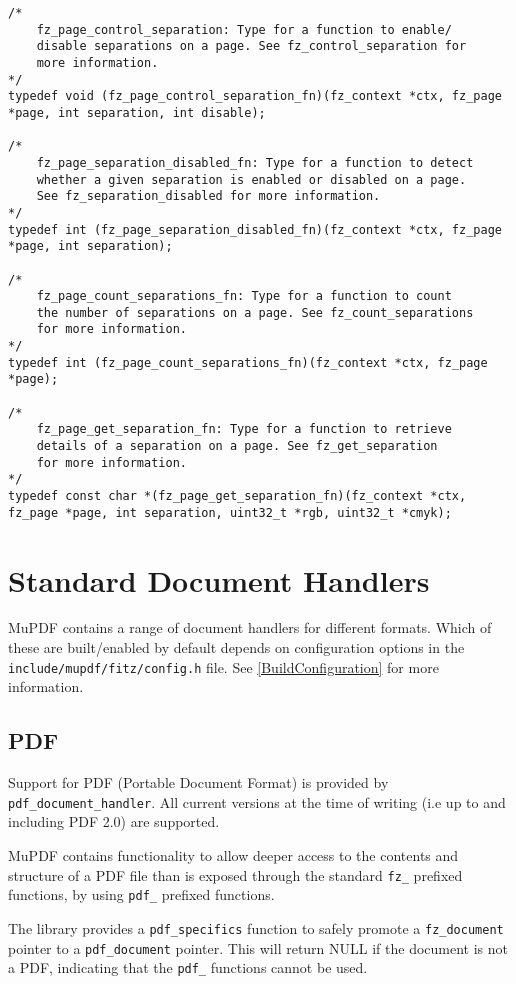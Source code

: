 \documentclass[oneside]{book}
\newcommand{\rjwref}[1] {\autoref{#1} \nameref{#1}}
\begin{document}
\begin{lstlisting}
/*
	fz_page_control_separation: Type for a function to enable/
	disable separations on a page. See fz_control_separation for
	more information.
*/
typedef void (fz_page_control_separation_fn)(fz_context *ctx, fz_page *page, int separation, int disable);

/*
	fz_page_separation_disabled_fn: Type for a function to detect
	whether a given separation is enabled or disabled on a page.
	See fz_separation_disabled for more information.
*/
typedef int (fz_page_separation_disabled_fn)(fz_context *ctx, fz_page *page, int separation);

/*
	fz_page_count_separations_fn: Type for a function to count
	the number of separations on a page. See fz_count_separations
	for more information.
*/
typedef int (fz_page_count_separations_fn)(fz_context *ctx, fz_page *page);

/*
	fz_page_get_separation_fn: Type for a function to retrieve
	details of a separation on a page. See fz_get_separation
	for more information.
*/
typedef const char *(fz_page_get_separation_fn)(fz_context *ctx, fz_page *page, int separation, uint32_t *rgb, uint32_t *cmyk);
\end{lstlisting}


\section{Standard Document Handlers}

MuPDF contains a range of document handlers for different formats. Which of these are built/enabled by default depends on configuration options in the \texttt{include/mupdf/fitz/config.h} file. See \rjwref{BuildConfiguration} for more information.

\subsection{PDF}

Support for PDF (Portable Document Format) is provided by \texttt{pdf\_document\_handler}. All current versions at the time of writing (i.e  up to and including PDF 2.0) are supported.

MuPDF contains functionality to allow deeper access to the contents and structure of a PDF file than is exposed through the standard \texttt{fz\_} prefixed functions, by using \texttt{pdf\_} prefixed functions.

The library provides a \texttt{pdf\_specifics} function to safely promote a \texttt{fz\_document} pointer to a \texttt{pdf\_document} pointer. This will return NULL if the document is not a PDF, indicating that the \texttt{pdf\_} functions cannot be used.
\end{document}
